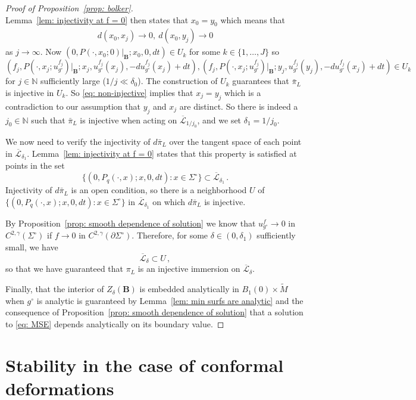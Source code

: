 \documentclass[11pt]{amsart}
\theoremstyle{definition}
\numberwithin{equation}{section}
\newcommand{\BB}{\mathbf B}
\begin{document}
\begin{proof}[Proof of Proposition~\ref{prop: bolker}]
\[\]
Lemma~\ref{lem: injectivity at f = 0} then states that $x_0 = y_0$ which means that 
\begin{eqnarray}\label{eq: points are near}
d(x_0,x_j)\to 0,\ d(x_0, y_j)\to 0
\end{eqnarray}
as $j\to\infty$. Now $(0, P(\cdot,x_0; 0)\vert_{\BB} ;x_0, 0,  dt )\in U_k$ for some $k \in\{ 1,\dots, J\}$ so 
$$(f_j, P(\cdot, x_j; u_{g^\circ}^{f_j})\vert_{\BB} ;x_j, u_{g^\circ}^{f_j} (x_j), -du_{g^\circ}^{f_j}(x_j) + dt ), (f_j, P(\cdot, x_j; u_{g^\circ}^{f_j})\vert_{\BB} ;y_j, u_{g^\circ}^{f_j} (y_j), -du_{g^\circ}^{f_j}(x_j) + dt ) \in U_k$$
for $j\in \mathbb N$ sufficiently large ($1/j\ll \delta_0$). The construction of $U_k$ guarantees that $\bar\pi_L$ is injective in $U_k$. So \eqref{eq: non-injective} implies that $x_j = y_j$ which is a contradiction to our assumption that $y_j$ and $x_j$ are distinct. So there is indeed a $j_0\in \mathbb N$ such that $\bar\pi_L$ is injective when acting on $\overline{\mathcal L}_{1/j_{0}}$, and we set $\delta_1 = 1/j_0$.


We now need to verify the injectivity of $d\bar\pi_L$ over the tangent space of each point in $\overline{\mathcal L}_{\delta_1}$. Lemma~\ref{lem: injectivity at f = 0} states that this property is satisfied at points in the set 
$$\{(0, P_q(\cdot, x); x, 0, dt)\colon x\in \Sigma^\circ\}\subset \overline{\mathcal L}_{\delta_1}\,.$$  
Injectivity of $d\bar \pi_L$ is an open condition, so there is a neighborhood $U$ of $\{(0, P_q(\cdot, x); x, 0, dt)\colon x\in \Sigma^\circ\}$ in $\overline{\mathcal L}_{\delta_1}$ on which $d\bar\pi_L$ is injective.

By Proposition~\ref{prop: smooth dependence of solution} we know that $u^{f}_{g^\circ} \to 0$ in $C^{2,\gamma}(\Sigma^\circ)$ if $f\to 0$ in $C^{2,\gamma}(\partial\Sigma^\circ)$. Therefore, for some $\delta\in (0,\delta_1)$ sufficiently small, we have 
\[
    \overline{\mathcal L}_{\delta} \subset U\,,
\]
so that we have guaranteed that $\pi_L$ is an injective immersion on $\overline{\mathcal L}_{\delta}$.

Finally, that the interior of $Z_\delta(\BB)$ is embedded analytically in $B_1(0)\times \widetilde{M}$ when $g^{\circ}$ is analytic is guaranteed by Lemma~\ref{lem: min surfs are analytic} and the consequence of Proposition~\ref{prop: smooth dependence of solution} that a solution to \eqref{eq: MSE} depends analytically on its boundary value. 
\end{proof}

\section{Stability in the case of conformal deformations} \label{sec_stability}
\end{document}

